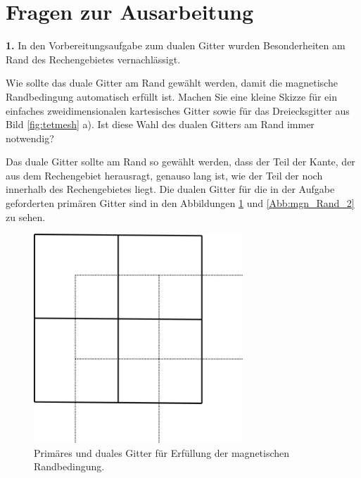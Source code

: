 \documentclass[Protokollheft.tex]{subfiles}
\begin{document}
\section{Fragen zur Ausarbeitung}

\begin{framed}
	\noindent \textbf{1.} In den Vorbereitungsaufgabe zum dualen Gitter wurden
Besonderheiten am Rand des Rechengebietes vernachlässigt.

Wie sollte das duale Gitter am Rand gewählt werden, damit die magnetische
Randbedingung automatisch erfüllt ist. Machen Sie eine kleine Skizze
für ein einfaches zweidimensionalen kartesisches Gitter sowie für
das Dreiecksgitter aus Bild \ref{fig:tetmesh} a). Ist diese Wahl
des dualen Gitters am Rand immer notwendig?\label{exer:autoHomNeumann}
\end{framed}
\noindent
Das duale Gitter sollte am Rand so gewählt werden, dass der Teil der Kante, der aus dem Rechengebiet herausragt, genauso lang ist, wie der Teil der noch innerhalb des Rechengebietes liegt. Die dualen Gitter für die in der Aufgabe geforderten primären Gitter sind in den Abbildungen \ref{Abb:mgn_Rand_1} und \ref{Abb:mgn_Rand_2} zu sehen.
\begin{figure}[h]
	\centering
	\includegraphics[width=0.7\textwidth]{mgn_Rand_1.png}
	\caption{Primäres und duales Gitter für Erfüllung der magnetischen Randbedingung.}
	\label{Abb:mgn_Rand_1}
\end{figure}
\end{document}
